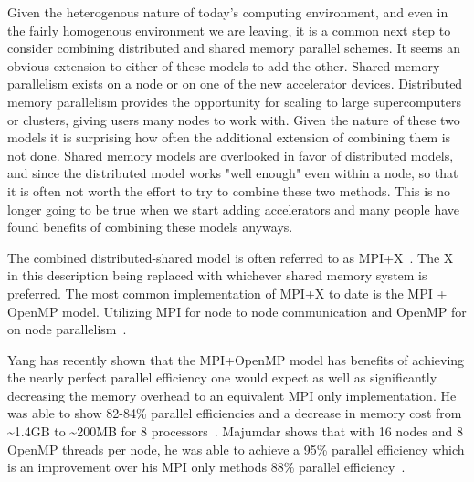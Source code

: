 %
Given the heterogenous nature of today's computing environment, and even in the fairly homogenous environment we are leaving, it is a common next step to consider combining distributed and shared memory parallel schemes.
%
It seems an obvious extension to either of these models to add the other.
%
Shared memory parallelism exists on a node or on one of the new accelerator devices.
%
Distributed memory parallelism provides the opportunity for scaling to large supercomputers or clusters, giving users many nodes to work with.
%
Given the nature of these two models it is surprising how often the additional extension of combining them is not done. 
%
Shared memory models are overlooked in favor of distributed models, and since the distributed model works "well enough" even within a node, so that it is often not worth the effort to try to combine these two methods.
%
This is no longer going to be true when we start adding accelerators and many people have found benefits of combining these models anyways.
%

%
The combined distributed-shared model is often referred to as MPI+X~\cite{michaelwolfe2014}.
%
The X in this description being replaced with whichever shared memory system is preferred.
%
The most common implementation of MPI+X to date is the MPI + OpenMP model.
%
Utilizing MPI for node to node communication and OpenMP for on node parallelism~\cite{michaelwolfe2014}.
%

%
Yang has recently shown that the MPI+OpenMP model has benefits of achieving the nearly perfect parallel efficiency one would expect as well as significantly decreasing the memory overhead to an equivalent MPI only implementation.
%
He was able to show 82-84\% parallel efficiencies and a decrease in memory cost from \textasciitilde1.4GB to \textasciitilde200MB for 8 processors~\cite{yanghybrid}.
%
Majumdar shows that with 16 nodes and 8 OpenMP threads per node, he was able to achieve a 95\% parallel efficiency which is an improvement over his MPI only methods 88\% parallel efficiency~\cite{majumdar2000parallel}. 
%
